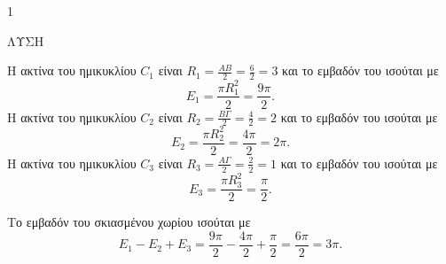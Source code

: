 \begin{ylh}{1}
    \item [Ύλη από εικόνα]
\end{ylh}
ΛΥΣΗ
\begin{alist}
    \item [α)] Η ακτίνα του ημικυκλίου $C_1$ είναι $R_1 = \frac{AB}{2} = \frac{6}{2} = 3$ και το εμβαδόν του ισούται με
    \[ E_1 = \frac{\pi R_1^2}{2} = \frac{9\pi}{2}. \]
    Η ακτίνα του ημικυκλίου $C_2$ είναι $R_2 = \frac{B\Gamma}{2} = \frac{4}{2} = 2$ και το εμβαδόν του ισούται με
    \[ E_2 = \frac{\pi R_2^2}{2} = \frac{4\pi}{2} = 2\pi. \]
    Η ακτίνα του ημικυκλίου $C_3$ είναι $R_3 = \frac{A\Gamma}{2} = \frac{2}{2} = 1$ και το εμβαδόν του ισούται με
    \[ E_3 = \frac{\pi R_3^2}{2} = \frac{\pi}{2}. \]
    \item [β)] Το εμβαδόν του σκιασμένου χωρίου ισούται με
    \[ E_1 - E_2 + E_3 = \frac{9\pi}{2} - \frac{4\pi}{2} + \frac{\pi}{2} = \frac{6\pi}{2} = 3\pi. \]
\end{alist}